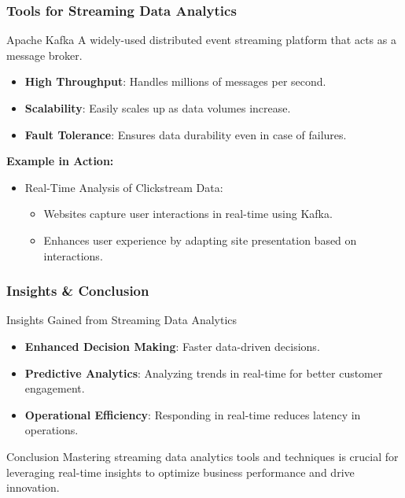 \documentclass[aspectratio=169]{beamer}
\begin{document}
\begin{frame}[fragile]
    \frametitle{Tools for Streaming Data Analytics}
    \begin{block}{Apache Kafka}
        A widely-used distributed event streaming platform that acts as a message broker. 
        \begin{itemize}
            \item \textbf{High Throughput}: Handles millions of messages per second.
            \item \textbf{Scalability}: Easily scales up as data volumes increase.
            \item \textbf{Fault Tolerance}: Ensures data durability even in case of failures.
        \end{itemize}

        \textbf{Example in Action:}
        \begin{itemize}
            \item Real-Time Analysis of Clickstream Data:
            \begin{itemize}
                \item Websites capture user interactions in real-time using Kafka.
                \item Enhances user experience by adapting site presentation based on interactions.
            \end{itemize}
        \end{itemize}
    \end{block}
\end{frame}

\begin{frame}[fragile]
    \frametitle{Insights & Conclusion}
    \begin{block}{Insights Gained from Streaming Data Analytics}
        \begin{itemize}
            \item \textbf{Enhanced Decision Making}: Faster data-driven decisions.
            \item \textbf{Predictive Analytics}: Analyzing trends in real-time for better customer engagement.
            \item \textbf{Operational Efficiency}: Responding in real-time reduces latency in operations.
        \end{itemize}
    \end{block}

    \begin{block}{Conclusion}
        Mastering streaming data analytics tools and techniques is crucial for leveraging real-time insights to optimize business performance and drive innovation.
    \end{block}
\end{frame}
\end{document}
